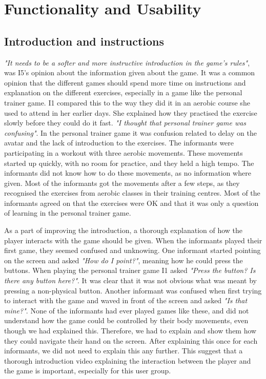 \section{Functionality and Usability}
\subsection{Introduction and instructions}
\emph{"It needs to be a softer and more instructive introduction in the game's rules"}, was I5's opinion about the information given about the game. It was a common opinion that the different games should spend more time on instructions and explanation on the different exercises, especially in a game like the personal trainer game. I1 compared this to the way they did it in an aerobic course she used to attend in her earlier days. She explained how they practised the exercise slowly before they could do it fast. \emph{"I thought that personal trainer game was confusing"}. In the personal trainer game it was confusion related to delay on the avatar and the lack of introduction to the exercises. The informants were participating in a workout with three aerobic movements. These movements started up quickly, with no room for practice, and they held a high tempo. The informants did not know how to do these movements, as no information where given. Most of the informants got the movements after a few steps, as they recognised the exercises from aerobic classes in their training centres. Most of the informants agreed on that the exercises were OK and that it was only a question of learning in the personal trainer game. 

As a part of improving the introduction, a thorough explanation of how the player interacts with the game should be given. When the informants played their first game, they seemed confused and unknowing. One informant started pointing on the screen and asked \emph{"How do I point?"}, meaning how he could press the buttons. When playing the personal trainer game I1 asked \emph{"Press the button? Is there any button here?"}. It was clear that it was not obvious what was meant by pressing a non-physical button. Another informant was confused when first trying to interact with the game and waved in front of the screen and asked \emph{"Is that mine?"}.  None of the informants had ever played games like these, and did not understand how the game could be controlled by their body movements, even though we had explained this. Therefore, we had to explain and show them how they could navigate their hand on the screen. After explaining this once for each informants, we did not need to explain this any further. This suggest that a thorough introduction video explaining the interaction between the player and the game is important, especially for this user group. 

